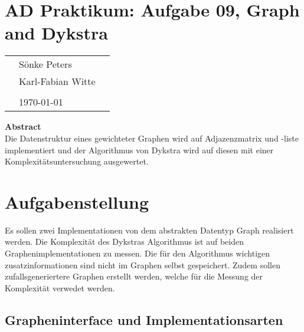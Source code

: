 \documentclass[
   draft=false
  ,paper=a4
  ,twoside=false
  ,fontsize=11pt
  ,headsepline
  ,DIV11
  ,parskip=full+
]{scrartcl} %
\begin{document}
\def\titel{AD Praktikum: Aufgabe 09, Graph and Dykstra}


\def\teilnehmer{ 
	& Sönke Peters & \\
    & Karl-Fabian Witte   & \\
}




\newlength{\txtw} %
\setlength{\txtw}{\textwidth} %
\addtolength{\txtw}{-10\tabcolsep} %

\def\me{\myName \newline \footnotesize{\url{\myEmail} } }

\section*{\titel}
\begin{tabular}{l p{0.4\txtw} p{0.4\txtw} }
	\teilnehmer
	& & \\
	& \today & \\
\end{tabular}


\centering
\textbf{Abstract} \\
Die Datenstruktur eines gewichteter Graphen wird auf Adjazenzmatrix und -liste implementiert und der Algorithmus von Dykstra wird auf diesen mit 
einer Komplexitätsuntersuchung ausgewertet. 
\section{Aufgabenstellung}
Es sollen zwei Implementationen von dem abstrakten Datentyp Graph 
realisiert werden. Die Komplexität des Dykstras Algorithmus 
ist auf beiden Graphenimplementationen zu messen. Die für den 
Algorithmus wichtigen zusatzinformationen sind nicht im Graphen
selbst gespeichert. 
Zudem sollen zufallsgeneriertere Graphen erstellt werden, welche 
für die Messung der Komplexität verwedet werden.

\subsection{Grapheninterface und Implementationsarten}
\end{document}
